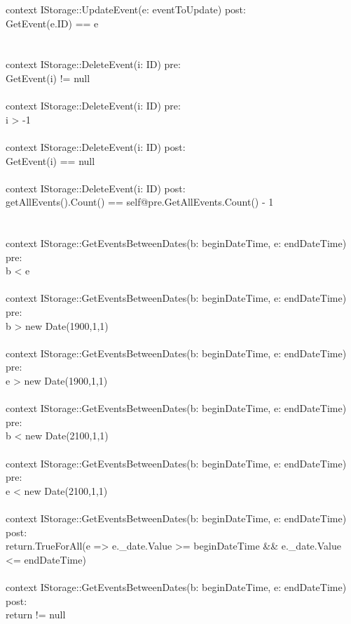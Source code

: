 context IStorage::UpdateEvent(e: eventToUpdate) post:\\
GetEvent(e.ID) == e\\\\\\
context IStorage::DeleteEvent(i: ID) pre:\\
GetEvent(i) != null\\\\
context IStorage::DeleteEvent(i: ID) pre:\\
i > -1\\\\
context IStorage::DeleteEvent(i: ID) post:\\
GetEvent(i) == null\\\\
context IStorage::DeleteEvent(i: ID) post:\\
getAllEvents().Count() == self@pre.GetAllEvents.Count() - 1\\\\\\
context IStorage::GetEventsBetweenDates(b: beginDateTime, e: endDateTime) pre:\\
b < e\\\\
context IStorage::GetEventsBetweenDates(b: beginDateTime, e: endDateTime) pre:\\
b > new Date(1900,1,1)\\\\
context IStorage::GetEventsBetweenDates(b: beginDateTime, e: endDateTime) pre:\\
e > new Date(1900,1,1)\\\\
context IStorage::GetEventsBetweenDates(b: beginDateTime, e: endDateTime) pre:\\
b < new Date(2100,1,1)\\\\
context IStorage::GetEventsBetweenDates(b: beginDateTime, e: endDateTime) pre:\\
e < new Date(2100,1,1)\\\\
context IStorage::GetEventsBetweenDates(b: beginDateTime, e: endDateTime) post:\\
return.TrueForAll(e => e.\_date.Value >= beginDateTime \&\& e.\_date.Value <= endDateTime)\\\\
context IStorage::GetEventsBetweenDates(b: beginDateTime, e: endDateTime) post:\\
return != null
\newpage